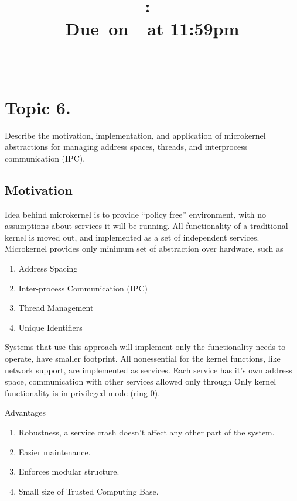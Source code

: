 \documentclass{article}
\title{
    \vspace{2in}
    \textmd{\textbf{\hmwkClass:\ \hmwkTitle}}\\
        \normalsize\vspace{0.1in}\small{Due\ on\ \hmwkDueDate\ at 11:59pm}\\
        \vspace{0.1in}\large{\textit{\hmwkClassInstructor\ \hmwkClassTime}}
    \vspace{3in}
}
\author{\textbf{\hmwkAuthorName}}
\date{}
\begin{document}
\maketitle

\pagebreak

\section{Topic 6.}  Describe the motivation, implementation, and application of microkernel
abstractions for managing address spaces, threads, and interprocess communication (IPC). \\

             \subsection{Motivation}
             Idea behind microkernel is to provide ``policy free'' environment, with no assumptions about
             services it will be running. All functionality of a traditional kernel is moved out, and
             implemented as a set of independent services. Microkernel provides only minimum set of
             abstraction over hardware, such as
             \begin{enumerate}[-, leftmargin = 0.7cm, nosep]
    \item Address Spacing
\item Inter-process Communication (IPC)
    \item Thread Management
    \item Unique Identifiers
    \end{enumerate}
    Systems that use this approach will implement only the functionality needs to operate, have
    smaller footprint. All nonessential for the kernel functions, like network support, are
    implemented as services. Each service has it's own address space, communication with other
    services allowed only through Only kernel functionality is in privileged mode (ring 0). 
    \vspace{0.2cm}

    Advantages
    \begin{enumerate}[-, leftmargin = 0.7cm, nosep]
    \item Robustness, a service crash doesn't affect any other part of the system.
    \item Easier maintenance.
    \item Enforces modular structure.
    \item Small size of Trusted Computing Base.
    \end{enumerate}
    \vspace{0.2cm}
\end{document}
